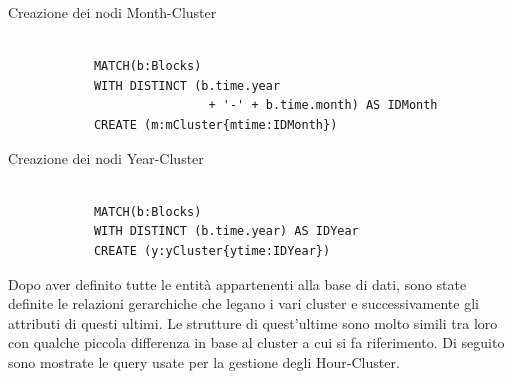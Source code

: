 \newpage \thispagestyle{mystyle}

 \begin{center}
Creazione dei nodi Month-Cluster
   \begin{lstlisting}

            MATCH(b:Blocks)  
            WITH DISTINCT (b.time.year 
                            + '-' + b.time.month) AS IDMonth
            CREATE (m:mCluster{mtime:IDMonth})
\end{lstlisting} 
\end{center}
\vspace{2mm}
\begin{center}
Creazione dei nodi Year-Cluster
   \begin{lstlisting}

            MATCH(b:Blocks)  
            WITH DISTINCT (b.time.year) AS IDYear
            CREATE (y:yCluster{ytime:IDYear})
\end{lstlisting} 
\end{center}


Dopo aver definito tutte le entità appartenenti alla base di dati, sono state definite le relazioni gerarchiche che legano i vari cluster e successivamente gli attributi di questi ultimi. Le strutture di quest'ultime sono molto simili tra loro con qualche piccola differenza in base al cluster a cui si fa riferimento. Di seguito sono mostrate le query usate per la gestione degli Hour-Cluster.

